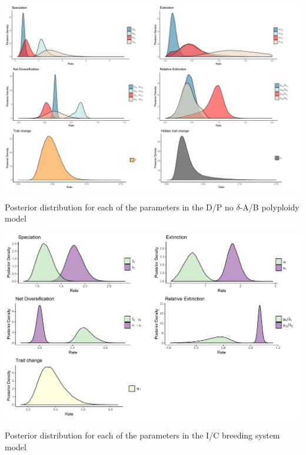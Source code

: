 \begin{suppfigure}
\includegraphics[width=\textwidth]{hisseDPnodipposteriordist.pdf}
\caption{Posterior distribution for each of the parameters in the D/P no $\delta$-A/B polyploidy model} %
\label{suppfigure:DPnodipAB}
\end{suppfigure}

\begin{suppfigure}
\includegraphics[width=\textwidth]{bisseSIposteriordist.pdf}
\caption{Posterior distribution for each of the parameters in the I/C breeding system model} %
\label{suppfigure:IC}
\end{suppfigure}

